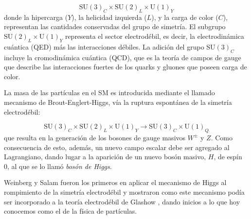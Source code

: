 \begin{equation}
  \text{SU}(3)_C \times \text{SU}(2)_L \times \text{U}(1)_Y
\end{equation}
%
donde la hipercarga ($Y$), la helicidad izquierda ($L$), y la carga de color ($C$),
representan las cantidades conservadas del grupo de simetría. El subgrupo
$\text{SU}(2)_L \times \text{U}(1)_Y$ representa el sector electrodébil, es
decir, la electrodinámica cuántica (QED) más las interacciones débiles.
La adición del grupo $\text{SU}(3)_C$ incluye la cromodinámica cuántica (QCD), que
es la teoría de campos de gauge que describe las interacciones fuertes de los
quarks y gluones que poseen carga de color.

La masa de las partículas en el SM es introducida mediante el llamado mecanismo
de Brout-Englert-Higgs\cite{PhysRevLett.13.321,PhysRevLett.13.508}, vía la
ruptura espontánea de la simetría electrodébil:

\begin{equation}
  \text{SU}(3)_C \times \text{SU}(2)_L \times \text{U}(1)_Y \to \text{SU}(3)_C
  \times \text{U}(1)_Q
\end{equation}
%
que resulta en la generación de los bosones de gauge masivos $W^\pm$ y $Z$. Como
consecuencia de esto, además, un nuevo campo escalar debe ser agregado al
Lagrangiano, dando lugar a la aparición de un nuevo bosón masivo, $H$, de espín
0, al que se lo llamó \emph{bosón de Higgs}.

Weinberg y Salam fueron los primeros en aplicar el mecanismo de Higgs al
rompimiento de la simetría electrodébil
\cite{PhysRevLett.19.1264,PhysRev.127.965} y mostraron como este mecanismo podía
ser incorporado a la teoría electrodébil de Glashow \cite{Glashow1961579}, dando
inicios a lo que hoy conocemos como el {\SM} de la física de partículas.

